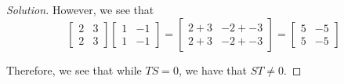 \documentclass{article}
\newenvironment{solution}{\begin{proof}[Solution]}{\end{proof}}
\begin{document}
\begin{solution}
		However, we see that
		\begin{equation*}
			\begin{bmatrix}
				2 & 3 \\ 2 & 3
			\end{bmatrix}
			\begin{bmatrix}
				1 & -1 \\ 1 & -1
			\end{bmatrix}
			=
			\begin{bmatrix}
				2 + 3 &  -2 + -3 \\ 2 + 3 & -2 + -3
			\end{bmatrix}
			=
			\begin{bmatrix}
				5 & -5 \\ 5 & -5
			\end{bmatrix}
		\end{equation*}
		
		Therefore, we see that while $TS = 0$, we have that $ST \not= 0$.
	\end{solution}

	\newpage
	
\end{document}
